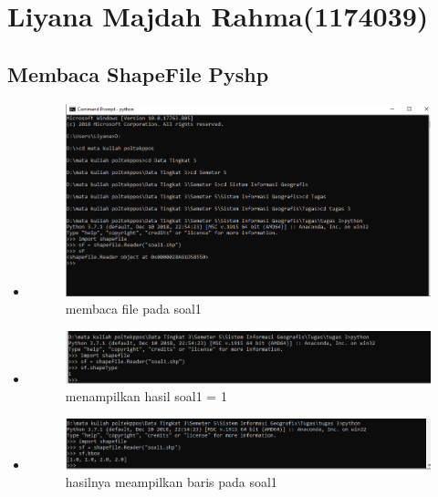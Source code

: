 \section{Liyana Majdah Rahma(1174039)}
\subsection{Membaca ShapeFile Pyshp}
\begin{itemize}
	\item 
	\begin{figure}[H]
		\includegraphics[width=12cm]{figures/1174039/tugas 3/hasilno1.PNG}
		\centering
		\caption{membaca file pada soal1}
	\end{figure}
	
	\item 
	\begin{figure}[H]
		\includegraphics[width=12cm]{figures/1174039/tugas 3/hasilno2.PNG}
		\centering
		\caption{menampilkan hasil soal1 = 1}
	\end{figure}
	
	\item 
	\begin{figure}[H]
		\includegraphics[width=12cm]{figures/1174039/tugas 3/hasilno3.PNG}
		\centering
		\caption{hasilnya meampilkan baris pada soal1}
	\end{figure}
	

\end{itemize}
